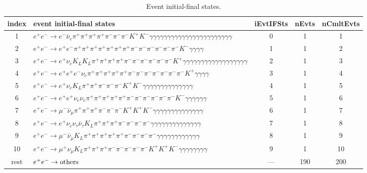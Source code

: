 \documentclass[landscape]{article}
\begin{document}
\begin{table}[htbp!]
\caption{Event initial-final states.}
\small
\centering
\begin{tabular}{|c|>{\centering}p{18cm}|c|c|c|}
\hline
index & event initial-final states & iEvtIFSts & nEvts & nCmltEvts \\
\hline
1 & $ e^{+} e^{-} \rightarrow e^{-} \bar{\nu}_{e} \pi^{+} \pi^{+} \pi^{+} \pi^{+} \pi^{-} \pi^{-} \pi^{-} K^{+} K^{-} \gamma \gamma \gamma \gamma \gamma \gamma \gamma \gamma \gamma \gamma \gamma \gamma \gamma \gamma \gamma \gamma \gamma \gamma \gamma \gamma \gamma \gamma \gamma $ & 0 & 1 & 1 \\
\hline
2 & $ e^{+} e^{-} \rightarrow e^{+} e^{-} \pi^{+} \pi^{+} \pi^{+} \pi^{+} \pi^{+} \pi^{+} \pi^{+} \pi^{-} \pi^{-} \pi^{-} \pi^{-} \pi^{-} \pi^{-} K^{-} \gamma \gamma \gamma \gamma $ & 1 & 1 & 2 \\
\hline
3 & $ e^{+} e^{-} \rightarrow e^{+} \nu_{e} K_{L} K_{L} \pi^{+} \pi^{+} \pi^{+} \pi^{+} \pi^{-} \pi^{-} \pi^{-} \pi^{-} \pi^{-} \pi^{-} K^{+} \gamma \gamma \gamma \gamma \gamma \gamma \gamma \gamma \gamma \gamma \gamma \gamma \gamma \gamma \gamma \gamma \gamma \gamma $ & 2 & 1 & 3 \\
\hline
4 & $ e^{+} e^{-} \rightarrow e^{+} e^{+} e^{-} \nu_{e} \pi^{+} \pi^{+} \pi^{+} \pi^{+} \pi^{+} \pi^{-} \pi^{-} \pi^{-} \pi^{-} \pi^{-} \pi^{-} \pi^{-} K^{+} \gamma \gamma \gamma \gamma $ & 3 & 1 & 4 \\
\hline
5 & $ e^{+} e^{-} \rightarrow e^{+} \nu_{e} K_{L} \pi^{+} \pi^{+} \pi^{-} \pi^{-} \pi^{-} K^{+} K^{-} \gamma \gamma \gamma \gamma \gamma \gamma \gamma \gamma \gamma \gamma \gamma \gamma \gamma \gamma $ & 4 & 1 & 5 \\
\hline
6 & $ e^{+} e^{-} \rightarrow e^{+} e^{+} \nu_{e} \nu_{e} \pi^{+} \pi^{+} \pi^{+} \pi^{+} \pi^{+} \pi^{-} \pi^{-} \pi^{-} \pi^{-} \pi^{-} \pi^{-} K^{-} \gamma \gamma \gamma \gamma \gamma \gamma $ & 5 & 1 & 6 \\
\hline
7 & $ e^{+} e^{-} \rightarrow \mu^{-} \bar{\nu}_{\mu} \pi^{+} \pi^{+} \pi^{+} \pi^{-} \pi^{-} \pi^{-} K^{+} K^{+} K^{-} \gamma \gamma \gamma \gamma \gamma \gamma \gamma \gamma \gamma \gamma \gamma \gamma \gamma \gamma $ & 6 & 1 & 7 \\
\hline
8 & $ e^{+} e^{-} \rightarrow e^{+} \nu_{e} \nu_{\tau} \bar{\nu}_{\tau} K_{L} \pi^{+} \pi^{+} \pi^{+} \pi^{-} \pi^{-} \pi^{-} \pi^{-} \gamma \gamma \gamma \gamma \gamma \gamma \gamma \gamma \gamma \gamma \gamma \gamma \gamma \gamma $ & 7 & 1 & 8 \\
\hline
9 & $ e^{+} e^{-} \rightarrow \mu^{-} \bar{\nu}_{\mu} K_{L} \pi^{+} \pi^{+} \pi^{+} \pi^{+} \pi^{+} \pi^{-} \pi^{-} \pi^{-} \pi^{-} \gamma \gamma \gamma \gamma \gamma \gamma \gamma \gamma \gamma \gamma \gamma \gamma $ & 8 & 1 & 9 \\
\hline
10 & $ e^{+} e^{-} \rightarrow \mu^{+} \nu_{\mu} K_{L} \pi^{+} \pi^{+} \pi^{+} \pi^{-} \pi^{-} \pi^{-} \pi^{-} \pi^{-} K^{+} K^{+} K^{-} \gamma \gamma \gamma \gamma \gamma \gamma \gamma \gamma $ & 9 & 1 & 10 \\
\hline
rest & $ e^{+} e^{-} \rightarrow \rm{others} $ & --- & 190 & 200 \\
\hline
\end{tabular}
\end{table}
\end{document}
